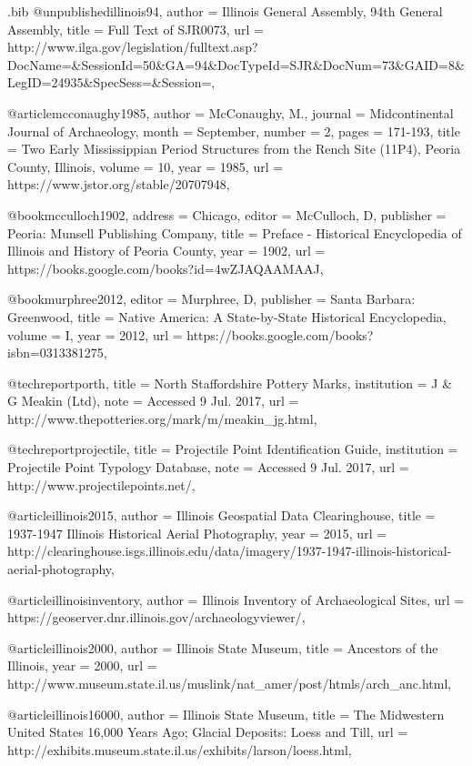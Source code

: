 \begin{filecontents}{\IJSRAidentifier.bib}
	@unpublished{illinois94,
		author = {Illinois General Assembly, 94th General Assembly},
		title = {Full Text of SJR0073},
		url = {http://www.ilga.gov/legislation/fulltext.asp?DocName=\&SessionId=50\&GA=94\&DocTypeId=SJR\&DocNum=73\&GAID=8\&LegID=24935\&SpecSess=\&Session=},
	}


	@article{mcconaughy1985,
		author = {McConaughy, M.},
		journal = {Midcontinental Journal of Archaeology},
		month = {September},
		number = {2},
		pages = {171-193},
		title = {Two Early Mississippian Period Structures from the Rench Site (11P4), Peoria County, Illinois},
		volume = {10},
		year = {1985},
		url = {https://www.jstor.org/stable/20707948},
	}

	@book{mcculloch1902,
		address = {Chicago},
		editor = {McCulloch, D},
		publisher = {Peoria: Munsell Publishing Company},
		title = {Preface - Historical Encyclopedia of Illinois and History of Peoria County},
		year = {1902},
		url = {https://books.google.com/books?id=4wZJAQAAMAAJ},
	}

	@book{murphree2012,
		editor = {Murphree, D},
		publisher = {Santa Barbara: Greenwood},
		title = {Native America: A State-by-State Historical Encyclopedia},
		volume = {I},
		year = {2012},
		url = {https://books.google.com/books?isbn=0313381275},
	}

	@techreport{porth,
		title = {North Staffordshire Pottery Marks},
		institution = {J \& G Meakin (Ltd)},
		note = {Accessed 9 Jul. 2017},
		url = {http://www.thepotteries.org/mark/m/meakin_jg.html},
	}

	@techreport{projectile,
		title = {Projectile Point Identification Guide},
		institution = {Projectile Point Typology Database},
		note = {Accessed 9 Jul. 2017},
		url = {http://www.projectilepoints.net/},
	}


	@article{illinois2015,
		author = {Illinois Geospatial Data Clearinghouse},
		title = {1937-1947 Illinois Historical Aerial Photography},
		year = {2015},
		url = {http://clearinghouse.isgs.illinois.edu/data/imagery/1937-1947-illinois-historical-aerial-photography},
	}

	@article{illinoisinventory,
		author = {Illinois Inventory of Archaeological Sites},
		url = {https://geoserver.dnr.illinois.gov/archaeologyviewer/},
	}

	@article{illinois2000,
		author = {Illinois State Museum},
		title = {Ancestors of the Illinois},
		year = {2000},
		url = {http://www.museum.state.il.us/muslink/nat\_amer/post/htmls/arch\_anc.html},
	}

	@article{illinois16000,
		author = {Illinois State Museum},
		title = {The Midwestern United States 16,000 Years Ago; Glacial Deposits: Loess and Till},
		url = {http://exhibits.museum.state.il.us/exhibits/larson/loess.html},
	}


\end{filecontents}
